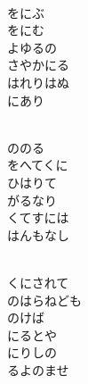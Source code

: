 \documentclass[10pt,b5j]{tarticle} %
\begin{document}
\begin{enumerate}
\begin{minipage}[c]{\blocksize}
        \vspace{\linespace}
        \item~\\
        をにぶ\\
        をにむ\\
        よゆるの\\
        さやかにる\\
        はれりはぬ\\
        にあり
        
    \end{minipage}
    \begin{minipage}[c]{\blocksize}
        
        \vspace{\linespace}
        \item~\\
        ののる\\
        をへてくに\\
        ひはりて\\
        がるなり\\
        くてすには\\
        はんもなし
        
    \end{minipage}
    \begin{minipage}[c]{\blocksize}
        
        \vspace{\linespace}
        \item~\\
        くにされて\\
        のはらねども\\
        のけば\\
        にるとや\\
        にりしの\\
        るよのませ
        

\end{minipage}
\end{enumerate}
\end{document}
